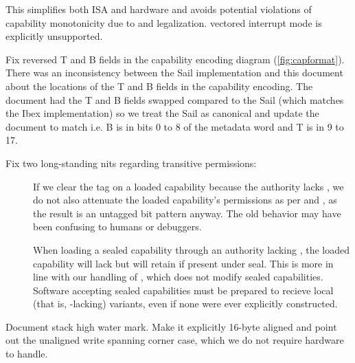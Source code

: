 \begin{description}
\begin{description}
    This simplifies both ISA and hardware and avoids potential violations of capability monotonicity due to  and  legalization.
    vectored interrupt mode is explicitly unsupported.
    \item[\ghpr{38}] Fix reversed T and B fields in the capability encoding diagram (\cref{fig:capformat}).
    There was an inconsistency between the Sail implementation and this document about the locations of the T and B fields in the capability encoding.
    The document had the T and B fields swapped compared to the Sail (which matches the Ibex implementation) so we treat the Sail as canonical and update the document to match i.e. B is in bits 0 to 8 of the metadata word and T is in 9 to 17.
    \item[\ghpr{44}] Fix two long-standing nits regarding transitive permissions:
      \begin{description}
        \item[] If we clear the tag on a loaded capability because the authority lacks \cappermMC,
          we do not also attenuate the loaded capability's permissions as per \cappermILG and \cappermLM,
          as the result is an untagged bit pattern anyway.
          The old behavior may have been confusing to humans or debuggers.
        \item[] When loading a sealed capability through an authority lacking \cappermILG,
          the loaded capability will lack \cappermG but will retain \cappermILG if present under seal.
          This is more in line with our handling of \cappermLM, which does not modify sealed capabilities.
          Software accepting sealed capabilities must be prepared to recieve local (that is, \cappermG-lacking) variants,
          even if none were ever explicitly constructed.
      \end{description}
    \end{description}
    \item[\ghissue{15}, \ghpr{49}] Document stack high water mark.
    Make it explicitly 16-byte aligned and point out the unaligned write spanning \mshwmb{} corner case, which we do not require hardware to handle.
\end{description}
